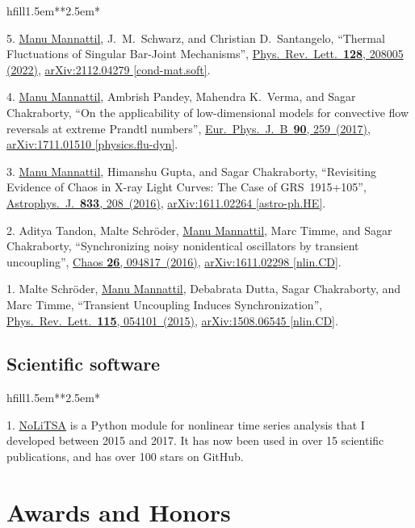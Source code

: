 \documentclass[10pt,a4paper,article,oneside]{memoir}
\def\bname{\underline{Manu Mannattil}}    %
\def\doi#1#2{\href{https://doi.org/#1}{#2}}
\def\arxiv#1#2{\href{https://arxiv.org/abs/#1}{arXiv:#1 [#2]}}
\begin{document}
\begin{flexlabelled}{hfill}{1.5em}{*}{*}{2.5em}{*}
  \setlength{\itemsep}{-0.25em}
  \item[5.] \bname, J.~M.~Schwarz, and Christian D.~Santangelo, ``Thermal Fluctuations of Singular Bar-Joint Mechanisms'', \doi{10.1103/PhysRevLett.128.208005}{Phys.~Rev.~Lett.~\textbf{128}, 208005 (2022)}, \arxiv{2112.04279}{cond-mat.soft}.
  \item[4.] \bname, Ambrish Pandey, Mahendra K.~Verma, and Sagar Chakraborty, ``On the applicability of low-dimensional models for convective flow reversals at extreme Prandtl numbers'', \doi{10.1140/epjb/e2017-80391-1}{Eur.~Phys.~J.~B~\textbf{90}, 259~(2017)}, \arxiv{1711.01510}{physics.flu-dyn}.
  \item[3.] \bname, Himanshu Gupta, and Sagar Chakraborty, ``Revisiting Evidence of Chaos in X-ray Light Curves: The Case of GRS~1915+105'', \doi{10.3847/1538-4357/833/2/208}{Astrophys.~J.~\textbf{833}, 208~(2016)}, \arxiv{1611.02264}{astro-ph.HE}.
  \item[2.] Aditya Tandon, Malte Schr\"{o}der, \bname, Marc Timme, and Sagar Chakraborty, ``Synchronizing noisy nonidentical oscillators by transient uncoupling'', \doi{10.1063/1.4959141}{Chaos \textbf{26}, 094817~(2016)}, \arxiv{1611.02298}{nlin.CD}.
  \item[1.] Malte Schr\"{o}der, \bname, Debabrata Dutta, Sagar Chakraborty, and Marc Timme, ``Transient Uncoupling Induces Synchronization'', \doi{10.1103/PhysRevLett.115.054101}{Phys.~Rev.~Lett.~\textbf{115}, 054101~(2015)}, \arxiv{1508.06545}{nlin.CD}.
\end{flexlabelled}

\subsection{Scientific software}

\begin{flexlabelled}{hfill}{1.5em}{*}{*}{2.5em}{*}
  \setlength{\itemsep}{-0.25em}
  \item[1.] \href{https://github.com/manu-mannattil/NoLiTSA}{NoLiTSA} is a Python module for nonlinear time series analysis that I developed between 2015 and 2017.  It has now been used in over 15 scientific publications, and has over 100 stars on GitHub.
\end{flexlabelled}


\section{Awards and Honors}
\end{document}
